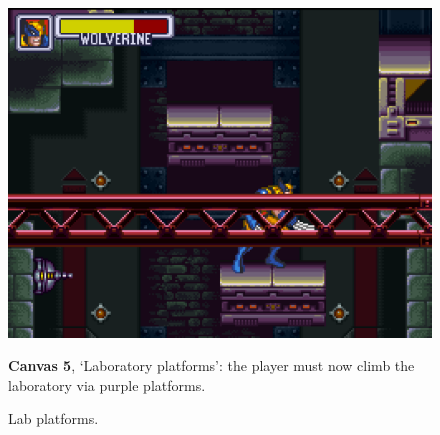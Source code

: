 \documentclass[english]{textolivre}
\begin{document}
\begin{figure}[htbp]
\begin{minipage}[t]{.47\textwidth}
\vspace{0pt}
\includegraphics[width=\textwidth]{fig-011.png}
\caption{Lab platforms.}
\label{fig-011}
\end{minipage}
\hfill
\begin{minipage}[t]{.47\textwidth}
\vspace{2pt}
\textbf{Canvas 5}, ‘Laboratory platforms’: the player must now climb the laboratory via purple platforms.
\end{minipage}
\end{figure}
\end{document}
